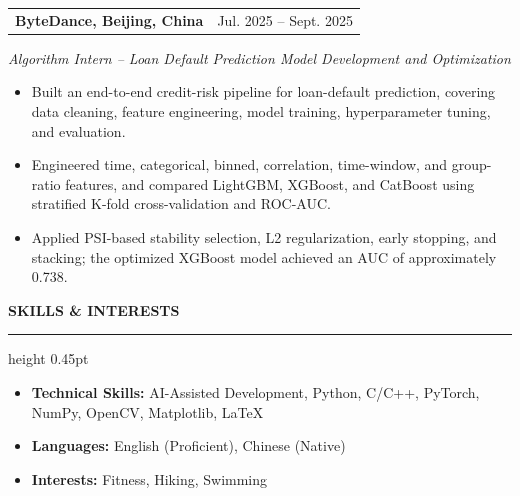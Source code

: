 \documentclass[10pt,a4paper]{article}
\makeatletter
\newcommand{\resumesection}[1]{%
  \par\vspace{6pt}%
  {\fontsize{12.8}{14}\selectfont\bfseries #1}\par
  \vspace{1pt}\hrule height 0.45pt\vspace{4pt}%
}
\newcommand{\datedheading}[2]{%
  \begin{tabular*}{\textwidth}{@{}p{0.79\textwidth}@{\extracolsep{\fill}}r@{}}
    \textbf{#1} & #2
  \end{tabular*}%
}
\newcommand{\roleline}[1]{%
  \vspace{0.5pt}\textit{#1}\par\vspace{0.5pt}%
}
\makeatother
\begin{document}
\vspace{3pt}
\datedheading{ByteDance, Beijing, China}{Jul. 2025 -- Sept. 2025}
\roleline{Algorithm Intern -- Loan Default Prediction Model Development and Optimization}
\begin{itemize}
  \item Built an end-to-end credit-risk pipeline for loan-default prediction, covering data cleaning, feature engineering, model training, hyperparameter tuning, and evaluation.
  \item Engineered time, categorical, binned, correlation, time-window, and group-ratio features, and compared LightGBM, XGBoost, and CatBoost using stratified K-fold cross-validation and ROC-AUC.
  \item Applied PSI-based stability selection, L2 regularization, early stopping, and stacking; the optimized XGBoost model achieved an AUC of approximately 0.738.
\end{itemize}

\resumesection{SKILLS \& INTERESTS}
\begin{itemize}
  \item \textbf{Technical Skills:} AI-Assisted Development, Python, C/C++, PyTorch, NumPy, OpenCV, Matplotlib, LaTeX
  \item \textbf{Languages:} English (Proficient), Chinese (Native)
  \item \textbf{Interests:} Fitness, Hiking, Swimming
\end{itemize}
\end{document}
